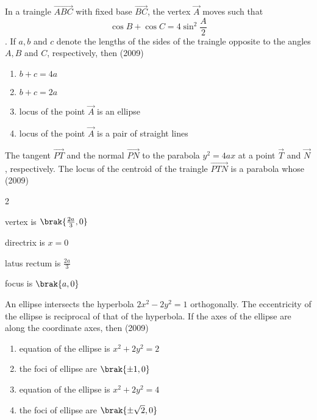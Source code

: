 \item In a traingle $\vec{ABC}$ with fixed base $\vec{BC}$, the vertex $\vec{A}$ moves such that
	$$\cos{B}+\cos{C}=4\sin^2{\frac{A}{2}}$$.
		If $a,b$ and $c$ denote the lengths of the sides of the traingle opposite to the angles $A,B$ and $C$, respectively, then \hfill(2009)\\
		\begin{enumerate}
			\item $b+c=4a$
			\item $b+c=2a$
			\item locus of the point $\vec{A}$ is an ellipse
			\item locus of the point $\vec{A}$ is a pair of straight lines
		\end{enumerate}

	\item The tangent $\vec{PT}$ and the normal $\vec{PN}$ to the parabola $y^2=4ax$ at a point $\vec{T}$ and $\vec{N}$, respectively. The locus of the centroid of the traingle $\vec{PTN}$ is a parabola whose \hfill(2009)\\
		\begin{enumerate}
		\end{enumerate}

\item An ellipse intersects the hyperbola $2x^2-2y^2=1$ orthogonally. The eccentricity of the ellipse is reciprocal of that of the hyperbola. If the axes of the ellipse are along the coordinate axes, then \hfill(2009)\\
		\begin{enumerate}
			\item equation of the ellipse is $x^2+2y^2=2$
			\item the foci of ellipse are $\brak{\pm1,0}$
			\item equation of the ellipse is $x^2+2y^2=4$
			\item the foci of ellipse are $\brak{\pm\sqrt{2},0}$
		\end{enumerate}

